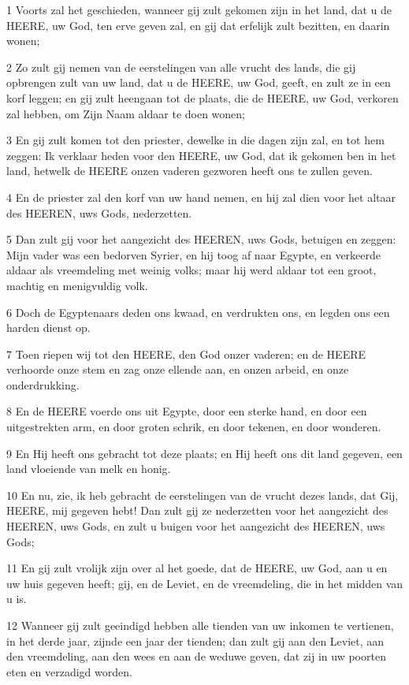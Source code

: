 \par 1 Voorts zal het geschieden, wanneer gij zult gekomen zijn in het land, dat u de HEERE, uw God, ten erve geven zal, en gij dat erfelijk zult bezitten, en daarin wonen;
\par 2 Zo zult gij nemen van de eerstelingen van alle vrucht des lands, die gij opbrengen zult van uw land, dat u de HEERE, uw God, geeft, en zult ze in een korf leggen; en gij zult heengaan tot de plaats, die de HEERE, uw God, verkoren zal hebben, om Zijn Naam aldaar te doen wonen;
\par 3 En gij zult komen tot den priester, dewelke in die dagen zijn zal, en tot hem zeggen: Ik verklaar heden voor den HEERE, uw God, dat ik gekomen ben in het land, hetwelk de HEERE onzen vaderen gezworen heeft ons te zullen geven.
\par 4 En de priester zal den korf van uw hand nemen, en hij zal dien voor het altaar des HEEREN, uws Gods, nederzetten.
\par 5 Dan zult gij voor het aangezicht des HEEREN, uws Gods, betuigen en zeggen: Mijn vader was een bedorven Syrier, en hij toog af naar Egypte, en verkeerde aldaar als vreemdeling met weinig volks; maar hij werd aldaar tot een groot, machtig en menigvuldig volk.
\par 6 Doch de Egyptenaars deden ons kwaad, en verdrukten ons, en legden ons een harden dienst op.
\par 7 Toen riepen wij tot den HEERE, den God onzer vaderen; en de HEERE verhoorde onze stem en zag onze ellende aan, en onzen arbeid, en onze onderdrukking.
\par 8 En de HEERE voerde ons uit Egypte, door een sterke hand, en door een uitgestrekten arm, en door groten schrik, en door tekenen, en door wonderen.
\par 9 En Hij heeft ons gebracht tot deze plaats; en Hij heeft ons dit land gegeven, een land vloeiende van melk en honig.
\par 10 En nu, zie, ik heb gebracht de eerstelingen van de vrucht dezes lands, dat Gij, HEERE, mij gegeven hebt! Dan zult gij ze nederzetten voor het aangezicht des HEEREN, uws Gods, en zult u buigen voor het aangezicht des HEEREN, uws Gods;
\par 11 En gij zult vrolijk zijn over al het goede, dat de HEERE, uw God, aan u en uw huis gegeven heeft; gij, en de Leviet, en de vreemdeling, die in het midden van u is.
\par 12 Wanneer gij zult geeindigd hebben alle tienden van uw inkomen te vertienen, in het derde jaar, zijnde een jaar der tienden; dan zult gij aan den Leviet, aan den vreemdeling, aan den wees en aan de weduwe geven, dat zij in uw poorten eten en verzadigd worden.
